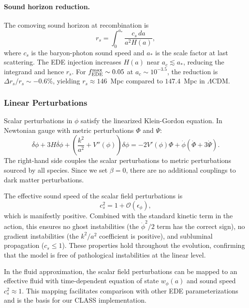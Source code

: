 \documentclass[a4paper,11pt]{article}
\begin{document}
\paragraph{Sound horizon reduction.}
The comoving sound horizon at recombination is
\begin{equation}
r_s = \int_0^{a_*} \frac{c_s \, da}{a^2 H(a)},
\label{eq:rs}
\end{equation}
where $c_s$ is the baryon-photon sound speed and $a_*$ is the scale factor at last scattering. The EDE injection increases $H(a)$ near $a_c \lesssim a_*$, reducing the integrand and hence $r_s$. For $f_{\rm EDE}^{\rm max} \sim 0.05$ at $a_c \sim 10^{-3.5}$, the reduction is $\Delta r_s/r_s \sim -0.6\%$, yielding $r_s \approx 146$~Mpc compared to $147.4$~Mpc in $\Lambda$CDM.

\subsubsection{Linear Perturbations}
\label{sec:perturbations}

Scalar perturbations in $\phi$ satisfy the linearized Klein-Gordon equation. In Newtonian gauge with metric perturbations $\Phi$ and $\Psi$:
\begin{equation}
\ddot{\delta\phi} + 3H\dot{\delta\phi} + \left(\frac{k^2}{a^2} + V''(\phi)\right)\delta\phi = -2V'(\phi)\Phi + \dot{\phi}(\dot{\Phi} + 3\dot{\Psi}).
\label{eq:perturb_eom}
\end{equation}
The right-hand side couples the scalar perturbations to metric perturbations sourced by all species. Since we set $\beta = 0$, there are no additional couplings to dark matter perturbations.

The effective sound speed of the scalar field perturbations is
\begin{equation}
c_s^2 = 1 + \mathcal{O}(\epsilon_\phi),
\label{eq:cs2}
\end{equation}
which is manifestly positive. Combined with the standard kinetic term in the action, this ensures no ghost instabilities (the $\dot{\phi}^2/2$ term has the correct sign), no gradient instabilities (the $k^2/a^2$ coefficient is positive), and subluminal propagation ($c_s \leq 1$). These properties hold throughout the evolution, confirming that the model is free of pathological instabilities at the linear level.

In the fluid approximation, the scalar field perturbations can be mapped to an effective fluid with time-dependent equation of state $w_\phi(a)$ and sound speed $c_s^2 \approx 1$. This mapping facilitates comparison with other EDE parameterizations and is the basis for our CLASS implementation.
\end{document}
